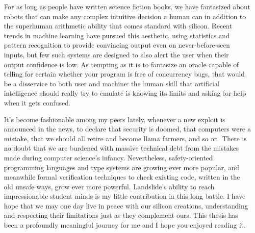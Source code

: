 \documentclass[12pt]{cmuthesis}
\begin{document}
For as long as people have written science fiction books,
we have fantasized about robots that can make any complex intuitive decision a human can
in addition to the superhuman arithmetic ability that comes standard with silicon.
Recent trends in machine learning have pursued this aesthetic,
using statistics and pattern recognition to provide convincing output even on never-before-seen inputs,
but few such systems are designed to also alert the user when their output confidence is low.
As tempting as it is to fantasize an oracle capable of telling for certain whether your program is free of concurrency bugs,
that would be a disservice to both user and machine:
the human skill that artificial intelligence should really try to emulate is
knowing its limits and asking for help when it gets confused.

It's become fashionable among my peers lately,
whenever a new exploit is announced in the news,
to declare that security is doomed,
that computers were a mistake,
that we should all retire and become llama farmers,
and so on.
There is no doubt that we are burdened with massive technical debt from the mistakes made
during computer science's infancy.
Nevertheless,
safety-oriented programming languages and type systems are growing ever more popular,
and meanwhile formal verification techniques to check existing code,
written in the old unsafe ways, grow ever more powerful.
Landslide's ability to reach impressionable student minds is my little contribution in this long battle.
I have hope that we may one day live in peace with our silicon creations,
understanding and respecting their limitations just as they complement ours.
This thesis has been a profoundly meaningful journey for me and I hope you enjoyed reading it.

%

\backmatter


\renewcommand{\bibsection}{\chapter{\bibname}
\inspirationalquote{Only a doctor of philosophy, Darth.}{Robert Marsh}
}

\end{document}
